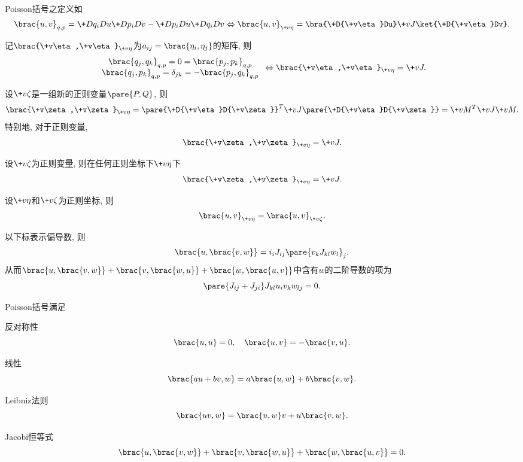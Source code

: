 \documentclass[../TheoreticalMechanics.tex]{subfiles}
\begin{document}
\begin{definition}[Poisson括号]
    Poisson括号之定义如
    \[ \brac{u,v}_{q,p} = \+D{q_i}Du\+D{p_i}Dv - \+D{p_i}Du\+D{q_i}Dv \Leftrightarrow \brac{u,v}_{\+v\eta} = \bra{\+D{\+v\eta}Du}\+vJ\ket{\+D{\+v\eta}Dv}. \]
\end{definition}
\begin{finale}
    \begin{theorem}[基的Poisson括号]
        记$\brac{\+v\eta,\+v\eta}_{\+v\eta}$为$a_{ij}=\brac{\eta_i,\eta_j}$的矩阵, 则
        \[ \begin{array}{c}
            \brac{q_j,q_k}_{q,p} = 0 = \brac{p_j,p_k}_{q,p} \\
            \brac{q_j,p_k}_{q,p} = \delta_{jk} = -\brac{p_j,q_k}_{q,p}
        \end{array} \Leftrightarrow \brac{\+v\eta,\+v\eta}_{\+v\eta} = \+vJ. \]
    \end{theorem}
\end{finale}
\begin{lemma}[变换基的Poisson括号]
    设$\+v\zeta$是一组新的正则变量$\pare{P,Q}$, 则
    \[ \brac{\+v\zeta,\+v\zeta}_{\+v\eta} = \pare{\+D{\+v\eta}D{\+v\zeta}}^T\+vJ\pare{\+D{\+v\eta}D{\+v\zeta}} = \+vM^T\+vJ\+vM. \]
    特别地, 对于正则变量,
    \[ \brac{\+v\zeta,\+v\zeta}_{\+v\eta} = \+vJ. \]
\end{lemma}
\begin{theorem}[正则变量的Poisson括号]
    设$\+v\zeta$为正则变量, 则在任何正则坐标下$\+v\eta$下
    \[ \brac{\+v\zeta,\+v\zeta}_{\+v\eta} = \+vJ. \]
\end{theorem}
\begin{finale}
    \begin{theorem}[Poisson括号作为不变量]
        设$\+v\eta$和$\+v\zeta$为正则坐标, 则
        \[ \brac{u,v}_{\+v\eta} = \brac{u,v}_{\+v\zeta}. \]
    \end{theorem}
\end{finale}
\begin{lemma}[Poisson括号的结合律]
    以下标表示偏导数, 则
    \[ \brac{u,\brac{v,w}} = i_iJ_{ij}\pare{v_kJ_{kl}w_l}_j. \]
    从而$\brac{u,\brac{v,w}} + \brac{v,\brac{w,u}} + \brac{w,\brac{u,v}}$中含有$w$的二阶导数的项为
    \[ \pare{J_{ij}+J_{ji}}J_{kl}u_iv_kw_{lj} = 0. \]
\end{lemma}
\begin{finale}
    \begin{theorem}[Poisson括号的性质]
        \label{thm:Poisson括号的性质}
        Poisson括号满足
        \begin{cenum}
            \item 反对称性
            \[ \brac{u,u} = 0,\quad \brac{u,v} = -\brac{v,u}. \]
            \item 线性
            \[ \brac{au+bv,w} = a\brac{u,w} + b\brac{v,w}. \]
            \item Leibniz法则
            \[ \brac{uv,w} = \brac{u,w}v + u\brac{v,w}. \]
            \item Jacobi恒等式
            \[ \brac{u,\brac{v,w}} + \brac{v,\brac{w,u}} + \brac{w,\brac{u,v}} = 0. \]
        \end{cenum}
    \end{theorem}
\end{finale}
\end{document}
